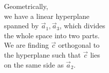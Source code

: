 \documentclass[preview]{standalone}
\begin{document}
\begin{center}
Geometrically,\\we have a linear hyperplane\\spanned by $\vec{a}_1,\vec{a}_3$, which divides\\the whole space into two parts.\\We are finding $\vec{c}$ orthogonal to\\the hyperplane such that $\vec{c}$ lies\\on the same side as $\vec{a}_2$.
\end{center}
\end{document}
